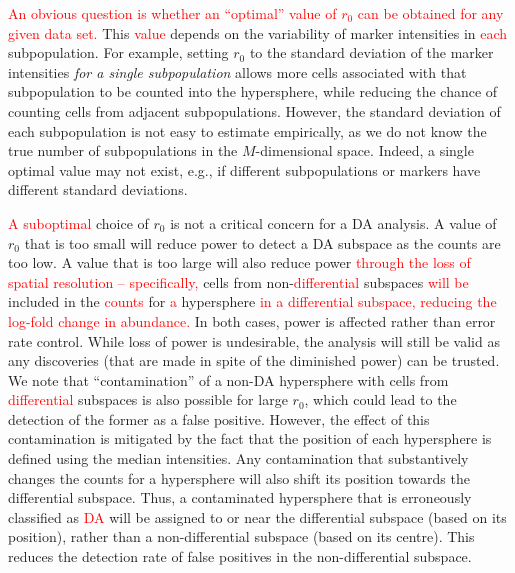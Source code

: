 \documentclass{article}
\newcommand\revised[1]{\textcolor{red}{#1}}
\begin{document}
\revised{An obvious question is whether an ``optimal'' value of $r_0$ can be obtained for any given data set.}
This \revised{value} depends on the variability of marker intensities in \revised{each} subpopulation.
For example, setting $r_0$ to the standard deviation of the marker intensities \textit{for a single subpopulation} allows more cells associated with that subpopulation to be counted into the hypersphere, while reducing the chance of counting cells from adjacent subpopulations.
However, the standard deviation of each subpopulation is not easy to estimate empirically, as we do not know the true number of subpopulations in the $M$-dimensional space.
Indeed, a single optimal value may not exist, e.g., if different subpopulations or markers have different standard deviations.

\revised{A suboptimal} choice of $r_0$ is not a critical concern for a DA analysis.
A value of $r_0$ that is too small will reduce power to detect a DA subspace as the counts are too low.
A value that is too large will also reduce power \revised{through the loss of spatial resolution -- specifically,} cells from non-\revised{differential} subspaces \revised{will be} included in the \revised{counts} for \revised{a} hypersphere \revised{in a differential subspace, reducing the log-fold change in abundance.}
In both cases, power is affected rather than error rate control.
While loss of power is undesirable, the analysis will still be valid as any discoveries (that are made in spite of the diminished power) can be trusted.
We note that ``contamination'' of a non-DA hypersphere with cells from \revised{differential} subspaces is also possible for large $r_0$, which could lead to the detection of the former as a false positive.
However, the effect of this contamination is mitigated by the fact that the position of each hypersphere is defined using the median intensities.
Any contamination that substantively changes the counts for a hypersphere will also shift its position towards the differential subspace.
Thus, a contaminated hypersphere that is erroneously classified as \revised{DA} will be assigned to or near the differential subspace (based on its position), rather than a non-differential subspace (based on its centre).
This reduces the detection rate of false positives in the non-differential subspace.
\end{document}
